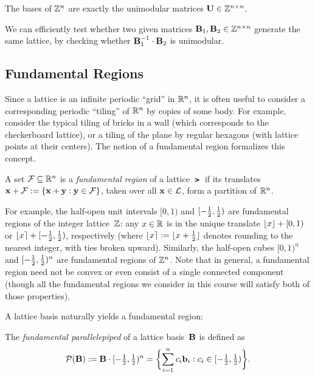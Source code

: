 \documentclass[11pt]{article}
\begin{document}
\begin{corollary}
  \label{cor:bases-Zn}
  The bases of $\mathbb{Z}^{n}$ are exactly the unimodular matrices $\mathbf{U} \in
  \mathbb{Z}^{n \times n}$.
\end{corollary}

\begin{corollary}
  \label{cor:check-same-lattice}
  We can efficiently test whether two given matrices
  $\mathbf{B}_{1}, \mathbf{B}_{2} \in \mathbb{Z}^{n \times n}$ generate the same
  lattice, by checking whether $\mathbf{B}_1^{-1} \cdot \mathbf{B}_2$ is
  unimodular.
\end{corollary}

\subsection{Fundamental Regions}
\label{sec:fundamental-regions}

Since a lattice is an infinite periodic ``grid'' in $\mathbb{R}^{n}$, it is
often useful to consider a corresponding periodic ``tiling'' of
$\mathbb{R}^{n}$ by copies of some body. For example, consider the typical
tiling of bricks in a wall (which corresponds to the checkerboard
lattice), or a tiling of the plane by regular hexagons (with lattice
points at their centers). The notion of a fundamental region
formalizes this concept.

\begin{definition}
  \label{def:fund-region}
  A set $\mathcal{F} \subseteq \mathbb{R}^{n}$ is a \emph{fundamental region} of a
  lattice $\lat$ if its translates
  $\mathbf{x}+\mathcal{F} := \{\mathbf{x} + \mathbf{y} : \mathbf{y} \in \mathcal{F}\}$, taken over
  all $\mathbf{x} \in \mathcal{L}$, form a partition of $\mathbb{R}^n$.
\end{definition}

For example, the half-open unit intervals $[0,1)$ and $[-\tfrac12,\tfrac12)$ are
fundamental regions of the integer lattice~$\mathbb{Z}$: any $x \in \mathbb{R}$ is in
the unique translate $\lfloor x\rfloor + [0,1)$ or $\lfloor x\rceil + [-\tfrac12,\tfrac12)$,
respectively (where $\lfloor x\rceil := \lfloor x + \tfrac12\rfloor$ denotes
rounding to the nearest integer, with ties broken upward).  Similarly,
the half-open cubes $[0,1)^{n}$ and $[-\tfrac12,\tfrac12)^{n}$ are fundamental
regions of $\mathbb{Z}^{n}$.  Note that in general, a fundamental region need
not be convex or even consist of a single connected component (though
all the fundamental regions we consider in this course will satisfy
both of those properties).

A lattice basis naturally yields a fundamental region:

\begin{definition}
  \label{def:fund-piped}
  The \emph{fundamental parallelepiped} of a lattice basis~$\mathbf{B}$ is
  defined as
  \begin{equation}
    \label{eq:fund-piped}
    \piped(\matB) := \matB \cdot \hohalf^n =
    \set[\bigg]{\sum_{i=1}^{n} c_i \vecb_i : c_i \in \hohalf}.
  \end{equation}
\end{definition}
    
\end{document}
